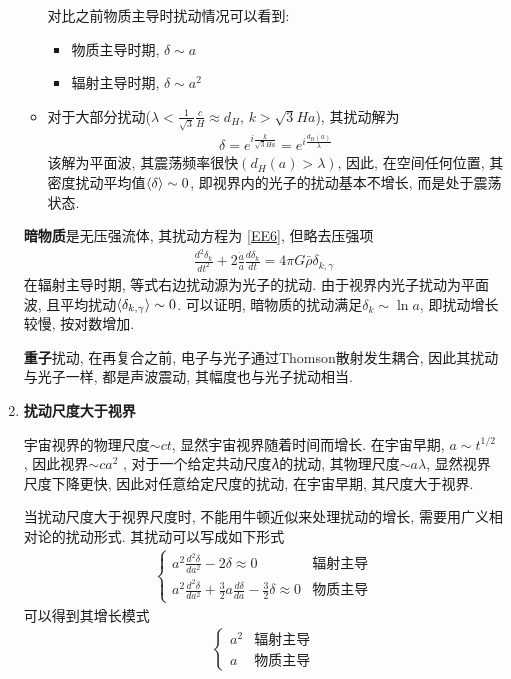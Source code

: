 \begin{enumerate}
\begin{itemize}
    对比之前物质主导时扰动情况可以看到:
    \begin{itemize}\small
        \item 物质主导时期, $\delta\sim a$
        \item 辐射主导时期, $\delta\sim a^2$
    \end{itemize}
        \item 对于大部分扰动($\lambda<\frac{1}{\sqrt{3}}\frac{c}{H}\approx d_H$, $k>\sqrt{3}Ha$), 其扰动解为
        \begin{align*}
            \delta=e^{i\frac{k}{\sqrt{3}Ha}}=e^{i\frac{d_H(a)}{\lambda}}
        \end{align*}
        该解为平面波, 其震荡频率很快$(d_H(a)>\lambda)$,  因此, 在空间任何位置, 其密度扰动平均值$\braket{\delta}\sim 0$, 即视界内的光子的扰动基本不增长, 而是处于震荡状态. 
    \end{itemize}

    \subitem \textbf{暗物质}是无压强流体, 其扰动方程为 \ref{EE6}, 但略去压强项
    \begin{align*}
        \frac{d^2\delta_k}{d t^2}+2\frac{\dot{a}}{a}\frac{d\delta_k}{dt}= 4\pi G \bar\rho\delta_{k, \gamma} 
    \end{align*}
    在辐射主导时期, 等式右边扰动源为光子的扰动. 由于视界内光子扰动为平面波, 且平均扰动$\braket{\delta_{k, \gamma}}\sim 0$. 可以证明,  暗物质的扰动满足$\delta_k\sim \ln a$, 即扰动增长较慢, 按对数增加. 

    \subitem \textbf{重子}扰动, 在再复合之前, 电子与光子通过Thomson散射发生耦合, 因此其扰动与光子一样, 都是声波震动, 其幅度也与光子扰动相当. 

    \item \textbf{扰动尺度大于视界}{\small
    
    \subitem 宇宙视界的物理尺度$\sim ct$, 显然宇宙视界随着时间而增长. 在宇宙早期, $a\sim t^{1/2}$ , 因此视界$\sim ca^2$ , 对于一个给定共动尺度𝜆的扰动, 其物理尺度$\sim a\lambda$, 显然视界尺度下降更快, 因此对任意给定尺度的扰动, 在宇宙早期, 其尺度大于视界. 

    当扰动尺度大于视界尺度时, 不能用牛顿近似来处理扰动的增长, 需要用广义相对论的扰动形式. 其扰动可以写成如下形式
    \begin{align*}
        \left\{ \begin{array}{ll}
            a^2\frac{d^2\delta}{da^2}-2\delta\approx 0 & \text{辐射主导}\\
            a^2\frac{d^2\delta}{da^2}+\frac{3}{2}a\frac{d\delta}{da}-\frac{3}{2}\delta\approx 0 & \text{物质主导}
        \end{array}  \right.
    \end{align*}
    可以得到其增长模式
    \begin{align*}
        \left\{ \begin{array}{ll}
            a^2& \text{辐射主导}\\
            a& \text{物质主导}
        \end{array}  \right.
    \end{align*}
    }
\end{enumerate}

